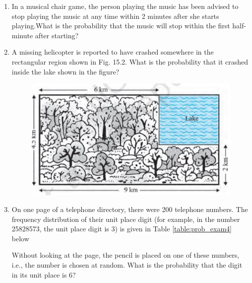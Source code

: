 \begin{enumerate}[label=\thesection.\arabic*.,ref=\thesection.\theenumi]
\item In a musical chair game, the person playing the music has been
advised to stop playing the music at any time within 2 minutes after she starts playing.What is the probability that the music will stop within the first half-minute after starting?

\item A missing helicopter is reported to have crashed somewhere in the rectangular region shown in Fig. 15.2. What is the probability that it crashed inside the
lake shown in the figure?
\begin{figure}[!ht]
\centering
\includegraphics[width=\columnwidth]{./prob/figs/lake.eps}
\caption{}
\label{fig:lake}
\end{figure}

   \item On one page of a telephone directory, there were 200 telephone numbers.
The frequency distribution of their unit place digit (for example, in the number 25828573, the unit place digit is 3) is given in Table \ref{table:prob_exam4}
below

\begin{table}[!ht]
\centering
{}
\caption{}
\label{table:prob_exam4}
\end{table}
Without looking at the page, the pencil is placed on one of these numbers, i.e., the number is chosen at random. What is the probability that the digit in its unit place is 6?\\
\solution



\end{enumerate}
